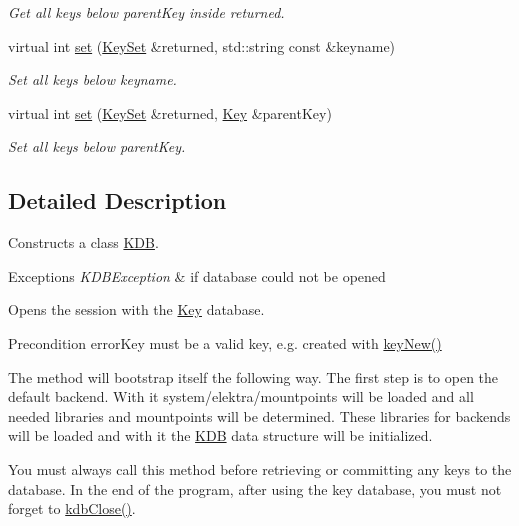 \begin{DoxyCompactItemize}
\begin{DoxyCompactList}\small\item\em Get all keys below parent\+Key inside returned. \end{DoxyCompactList}\item 
virtual int \hyperlink{classkdb_1_1KDB_a29087a6a1a7de334f4e5b62ffe5d6e6e}{set} (\hyperlink{classkdb_1_1KeySet}{Key\+Set} \&returned, std\+::string const \&keyname)
\begin{DoxyCompactList}\small\item\em Set all keys below keyname. \end{DoxyCompactList}\item 
virtual int \hyperlink{classkdb_1_1KDB_a62a4fafbe21d9519b31a7868aa05f3e3}{set} (\hyperlink{classkdb_1_1KeySet}{Key\+Set} \&returned, \hyperlink{classkdb_1_1Key}{Key} \&parent\+Key)
\begin{DoxyCompactList}\small\item\em Set all keys below parent\+Key. \end{DoxyCompactList}\end{DoxyCompactItemize}


\subsection{Detailed Description}
Constructs a class \hyperlink{classkdb_1_1KDB}{K\+DB}. 


\begin{DoxyExceptions}{Exceptions}
{\em K\+D\+B\+Exception} & if database could not be opened\\
\hline
\end{DoxyExceptions}
Opens the session with the \hyperlink{classkdb_1_1Key}{Key} database. \begin{DoxyPrecond}{Precondition}
error\+Key must be a valid key, e.\+g. created with \hyperlink{group__key_gad23c65b44bf48d773759e1f9a4d43b89}{key\+New()}
\end{DoxyPrecond}
The method will bootstrap itself the following way. The first step is to open the default backend. With it system/elektra/mountpoints will be loaded and all needed libraries and mountpoints will be determined. These libraries for backends will be loaded and with it the {\ttfamily \hyperlink{classkdb_1_1KDB}{K\+DB}} data structure will be initialized.

You must always call this method before retrieving or committing any keys to the database. In the end of the program, after using the key database, you must not forget to \hyperlink{group__kdb_gadb54dc9fda17ee07deb9444df745c96f}{kdb\+Close()}.

